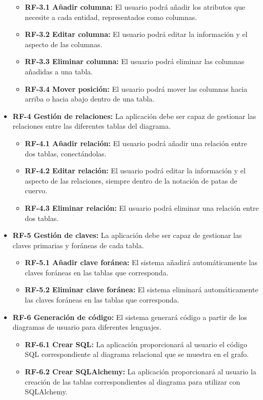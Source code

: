 \begin{itemize}
    \begin{itemize}
        \item \textbf{RF-3.1 Añadir columna: }El usuario podrá añadir los atributos que necesite a cada entidad, representados como columnas.
        \item \textbf{RF-3.2 Editar columna: }El usuario podrá editar la información y el aspecto de las columnas.
        \item \textbf{RF-3.3 Eliminar columna: }El usuario podrá eliminar las columnas añadidas a una tabla.
        \item \textbf{RF-3.4 Mover posición: }El usuario podrá mover las columnas hacia arriba o hacia abajo dentro de una tabla.
    \end{itemize}
    \item \textbf{RF-4 Gestión de relaciones: }La aplicación debe ser capaz de gestionar las relaciones entre las diferentes tablas del diagrama.
    \begin{itemize}
        \item \textbf{RF-4.1 Añadir relación: }El usuario podrá añadir una relación entre dos tablas, conectándolas.
        \item \textbf{RF-4.2 Editar relación: }El usuario podrá editar la información y el aspecto de las relaciones, siempre dentro de la notación de patas de cuervo.
        \item \textbf{RF-4.3 Eliminar relación: }El usuario podrá eliminar una relación entre dos tablas.
    \end{itemize}
    \item \textbf{RF-5 Gestión de claves: }La aplicación debe ser capaz de gestionar las claves primarias y foráneas de cada tabla.
    \begin{itemize}
        \item \textbf{RF-5.1 Añadir clave foránea: }El sistema añadirá automáticamente las claves foráneas en las tablas que corresponda.
        \item \textbf{RF-5.2 Eliminar clave foránea: }El sistema eliminará automáticamente las claves foráneas en las tablas que corresponda.
    \end{itemize}
    \item \textbf{RF-6 Generación de código: }El sistema generará código a partir de los diagramas de usuario para diferentes lenguajes.
    \begin{itemize}
        \item \textbf{RF-6.1 Crear SQL: }La aplicación proporcionará al usuario el código SQL correspondiente al diagrama relacional que se muestra en el grafo.
        \item \textbf{RF-6.2 Crear SQLAlchemy: }La aplicación proporcionará al usuario la creación de las tablas correspondientes al diagrama para utilizar con SQLAlchemy.
    \end{itemize}
\end{itemize}

